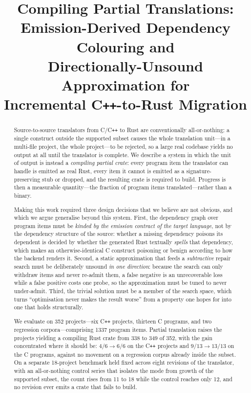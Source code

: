 \documentclass[10pt,twocolumn]{article}
\title{\vspace{-2em}Compiling Partial Translations:\\
Emission-Derived Dependency Colouring and\\
Directionally-Unsound Approximation for\\
Incremental C\texttt{++}-to-Rust Migration}
\author{}
\date{}
\begin{document}
\maketitle

\begin{abstract}
Source-to-source translators from C/C\texttt{++} to Rust are conventionally
all-or-nothing: a single construct outside the supported subset causes the
whole translation unit---in a multi-file project, the whole project---to be
rejected, so a large real codebase yields no output at all until the
translator is complete. We describe a system in which the unit of output is
instead a \emph{compiling partial crate}: every program item the translator
can handle is emitted as real Rust, every item it cannot is emitted as a
signature-preserving stub or dropped, and the resulting crate is required to
build. Progress is then a measurable quantity---the fraction of program items
translated---rather than a binary.

Making this work required three design decisions that we believe are not
obvious, and which we argue generalise beyond this system. First, the
dependency graph over program items must be \emph{kinded by the emission
contract of the target language}, not by the dependency structure of the
source: whether a missing dependency poisons its dependent is decided by
whether the generated Rust textually \emph{spells} that dependency, which
makes an otherwise-identical C construct poisoning or benign according to how
the backend renders it. Second, a static approximation that feeds a
\emph{subtractive} repair search must be deliberately unsound \emph{in one
direction}: because the search can only withdraw items and never re-admit
them, a false negative is an unrecoverable loss while a false positive costs
one probe, so the approximation must be tuned to never under-admit. Third,
the trivial solution must be a member of the search space, which turns
``optimisation never makes the result worse'' from a property one hopes for
into one that holds structurally.

We evaluate on 352 projects---six C\texttt{++} projects, thirteen C programs,
and two regression corpora---comprising 1337 program items. Partial
translation raises the projects yielding a compiling Rust crate from 338 to
349 of 352, with the gain concentrated where it should be: $4/6 \rightarrow
6/6$ on the C\texttt{++} projects and $9/13 \rightarrow 13/13$ on the C
programs, against no movement on a regression corpus already inside the
subset. On a separate 18-project benchmark held fixed across eight revisions
of the translator, with an all-or-nothing control series that isolates the
mode from growth of the supported subset, the count rises from 11 to 18 while
the control reaches only 12, and no revision ever emits a crate that fails to
build.


\end{abstract}
\end{document}
